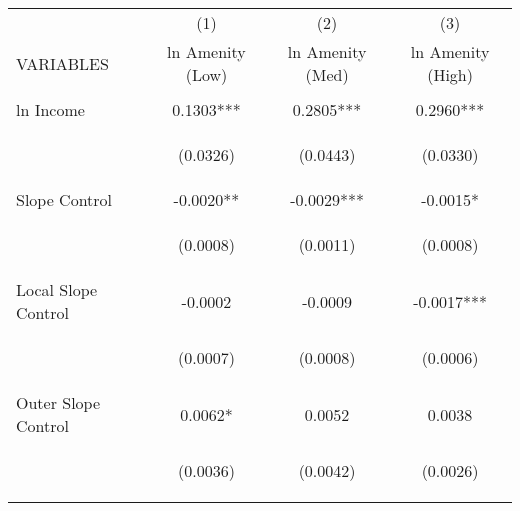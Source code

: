 
\begin{tabular}{lccc} \hline
 & (1) & (2) & (3) \\
VARIABLES & ln Amenity (Low) & ln Amenity (Med) & ln Amenity (High) \\ \hline
\vspace{4pt} & \begin{footnotesize}\end{footnotesize} & \begin{footnotesize}\end{footnotesize} & \begin{footnotesize}\end{footnotesize} \\
ln Income & 0.1303*** & 0.2805*** & 0.2960*** \\
\vspace{4pt} & \begin{footnotesize}(0.0326)\end{footnotesize} & \begin{footnotesize}(0.0443)\end{footnotesize} & \begin{footnotesize}(0.0330)\end{footnotesize} \\
Slope Control & -0.0020** & -0.0029*** & -0.0015* \\
\vspace{4pt} & \begin{footnotesize}(0.0008)\end{footnotesize} & \begin{footnotesize}(0.0011)\end{footnotesize} & \begin{footnotesize}(0.0008)\end{footnotesize} \\
Local Slope Control & -0.0002 & -0.0009 & -0.0017*** \\
\vspace{4pt} & \begin{footnotesize}(0.0007)\end{footnotesize} & \begin{footnotesize}(0.0008)\end{footnotesize} & \begin{footnotesize}(0.0006)\end{footnotesize} \\
Outer Slope Control & 0.0062* & 0.0052 & 0.0038 \\
 & \begin{footnotesize}(0.0036)\end{footnotesize} & \begin{footnotesize}(0.0042)\end{footnotesize} & \begin{footnotesize}(0.0026)\end{footnotesize} \\

\end{tabular}
